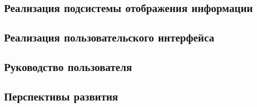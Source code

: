
\subsection{Реализация подсистемы отображения информации}
\pagebreak



\subsection{Реализация пользовательского интерфейса}
\pagebreak



\subsection{Руководство пользователя}
\pagebreak



\subsection{Перспективы развития}
\pagebreak
